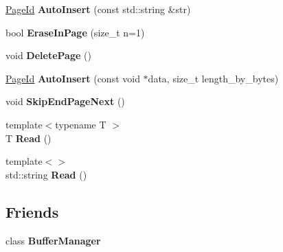 \begin{DoxyCompactItemize}
\mbox{\hyperlink{struct_generic_i_o_id}{Page\+Id}} {\bfseries Auto\+Insert} (const std\+::string \&str)
\item 
\mbox{\label{class_buffer_manager_1_1_iterator_3_01char_01_5_01_4_a9beb324be70afa06e7b86e71dfdcdbf2}} 
bool {\bfseries Erase\+In\+Page} (size\+\_\+t n=1)
\item 
\mbox{\label{class_buffer_manager_1_1_iterator_3_01char_01_5_01_4_a6a0c407bacbaf9492d915beb836cd024}} 
void {\bfseries Delete\+Page} ()
\item 
\mbox{\label{class_buffer_manager_1_1_iterator_3_01char_01_5_01_4_a431ebf70a4813c664a6c1e28f6c920f4}} 
\mbox{\hyperlink{struct_generic_i_o_id}{Page\+Id}} {\bfseries Auto\+Insert} (const void $\ast$data, size\+\_\+t length\+\_\+by\+\_\+bytes)
\item 
\mbox{\label{class_buffer_manager_1_1_iterator_3_01char_01_5_01_4_a86b699194b2bf10f6ddfc15b7b90bb1e}} 
void {\bfseries Skip\+End\+Page\+Next} ()
\item 
\mbox{\label{class_buffer_manager_1_1_iterator_3_01char_01_5_01_4_ac9f2bbc8b6fc8cb446c6e4128a7b3e3d}} 
{\footnotesize template$<$typename T $>$ }\\T {\bfseries Read} ()
\item 
\mbox{\label{class_buffer_manager_1_1_iterator_3_01char_01_5_01_4_ae1f20844687c7256a70668eda7d77dcc}} 
{\footnotesize template$<$$>$ }\\std\+::string {\bfseries Read} ()
\end{DoxyCompactItemize}
\subsection*{Friends}
\begin{DoxyCompactItemize}
\item 
\mbox{\label{class_buffer_manager_1_1_iterator_3_01char_01_5_01_4_a16155b1414091f690eefe4f5292199dc}} 
class {\bfseries Buffer\+Manager}
\end{DoxyCompactItemize}


